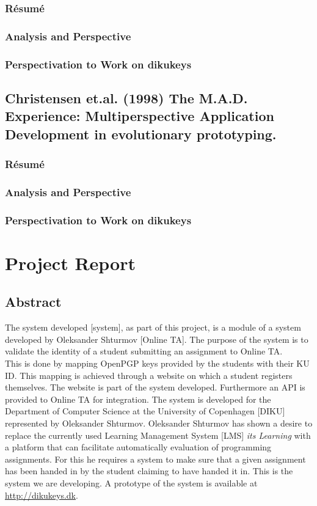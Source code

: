 \documentclass[11pt,a4paper]{report}
\begin{document}
\subsection{Résumé}
\subsection{Analysis and Perspective}
\subsection{Perspectivation to Work on dikukeys}

\newpage
\section{Christensen et.al. (1998) The M.A.D. Experience: Multiperspective Application Development in evolutionary prototyping.}
\subsection{Résumé}
\subsection{Analysis and Perspective}
\subsection{Perspectivation to Work on dikukeys}


\chapter{Project Report}\label{ch:Project_Report}

\section{Abstract}\label{sec:Abstract}
The system developed [system], as part of this project, is a module of a system developed by Oleksander Shturmov [Online TA]. The purpose of the system is to validate the identity of a student submitting an assignment to Online TA. \\
This is done by mapping OpenPGP keys provided by the students with their KU ID. This mapping is achieved through a website on which a student registers themselves. The website is part of the system developed. Furthermore an API is provided to Online TA for integration. The system is developed for the Department of Computer Science at the University of Copenhagen [DIKU] represented by Oleksander Shturmov. Oleksander Shturmov has shown a desire to replace the currently used Learning Management System [LMS] \textit{its Learning} with a platform that can facilitate automatically evaluation of programming assignments. For this he requires a system to make sure that a given assignment has been handed in by the student claiming to have handed it in. This is the system we are developing.
A prototype of the system is available at \url{http://dikukeys.dk}.
\end{document}
